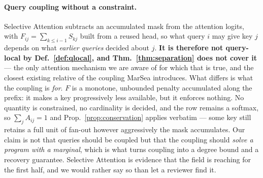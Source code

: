 \documentclass{article}
\begin{document}
\paragraph{Query coupling without a constraint.} Selective Attention
\citep{leviathan2024selective} subtracts an accumulated mask from the attention logits, with
$F_{ij}=\sum_{k\le i-1}S_{kj}$ built from a reused head, so what query $i$ may give key $j$
depends on what \emph{earlier queries} decided about $j$. \textbf{It is therefore not
query-local by Def.~\ref{def:qlocal}, and Thm.~\ref{thm:separation} does not cover it} --- the
only attention mechanism we are aware of for which that is true, and the closest existing relative
of the coupling MarSea introduces. What differs is what the coupling is \emph{for}. $F$ is a
monotone, unbounded penalty accumulated along the prefix: it makes a key progressively less
available, but it enforces nothing. No quantity is constrained, no cardinality is decided, and
the row remains a softmax, so $\sum_j A_{ij}=1$ and Prop.~\ref{prop:conservation} applies
verbatim --- some key still retains a full unit of fan-out however aggressively the mask
accumulates. Our claim is not that queries should be coupled but that the coupling should
\emph{solve a program with a marginal}, which is what turns coupling into a degree bound and a
recovery guarantee. Selective Attention is evidence that the field is reaching for the first
half, and we would rather say so than let a reviewer find it.
\end{document}

